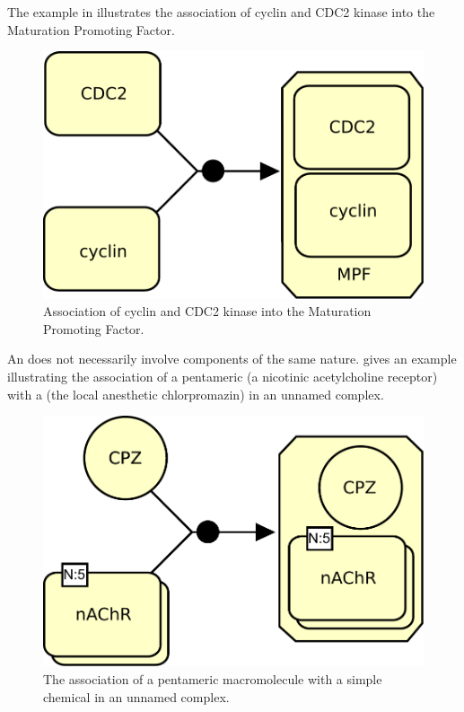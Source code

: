 The example in  illustrates the association of cyclin and CDC2 kinase into the Maturation Promoting Factor.

\begin{figure}[H]
  \centering
  \includegraphics[scale = 0.5]{le_images/association-MPF}
  \caption{Association of cyclin and CDC2 kinase into the Maturation Promoting Factor.}
  \label{fig:assoc-cyclin}
\end{figure}

An  does not necessarily involve components of the same nature.  gives an example illustrating the association of a pentameric  (a nicotinic acetylcholine receptor) with a  (the local anesthetic chlorpromazin) in an unnamed complex.

\begin{figure}[H]
  \centering
  \includegraphics[scale = 0.5]{le_images/association-unamed}
  \caption{The association of a pentameric macromolecule with a simple chemical in an unnamed complex.}
  \label{fig:assoc-unamed}
\end{figure}

